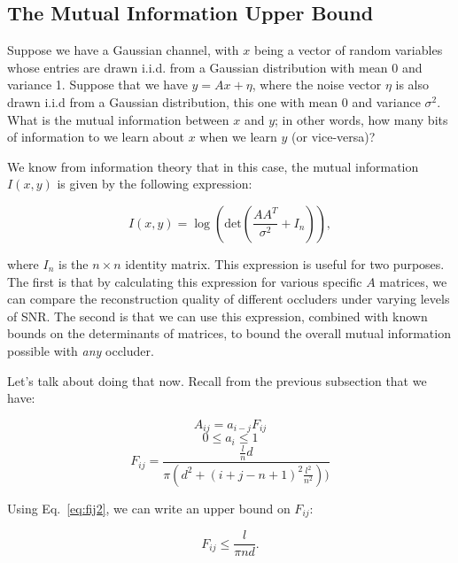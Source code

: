 \documentclass[11pt]{article}
\begin{document}
\subsection{The Mutual Information Upper Bound}

Suppose we have a Gaussian channel, with $x$ being a vector of random variables whose entries are drawn i.i.d. from a Gaussian distribution with mean 0 and variance 1. Suppose that we have $y = Ax + \eta$, where the noise vector $\eta$ is also drawn i.i.d from a Gaussian distribution, this one with mean 0 and variance $\sigma^2$. What is the mutual information between $x$ and $y$; in other words, how many bits of information to we learn about $x$ when we learn $y$ (or vice-versa)?

We know from information theory that in this case, the mutual information $I(x, y)$ is given by the following expression:

\begin{equation}
I(x, y) = \log(\mathrm{det}(\frac{AA^T}{\sigma^2} + I_n)),
\end{equation}

where $I_n$ is the $n \times n$ identity matrix. This expression is useful for two purposes. The first is that by calculating this expression for various specific $A$ matrices, we can compare the reconstruction quality of different occluders under varying levels of SNR. The second is that we can use this expression, combined with known bounds on the determinants of matrices, to bound the overall mutual information possible with \emph{any} occluder.

Let's talk about doing that now. Recall from the previous subsection that we have:

\begin{equation}
    \label{eq:transparency}
A_{ij} = a_{i-j} F_{ij}
\end{equation}
\begin{equation}
    \label{eq:ai}
0 \le a_i \le 1
\end{equation}
\begin{equation}
    \label{eq:fij2}
F_{ij} = \frac{\frac{l}{n} d}{\pi (d^2 + (i+j-n+1)^2\frac{l^2}{n^2}))}
\end{equation}

Using Eq.~\ref{eq:fij2}, we can write an upper bound on $F_{ij}$:

\begin{equation}
F_{ij} \le \frac{l}{\pi nd}.
\end{equation}
\end{document}
